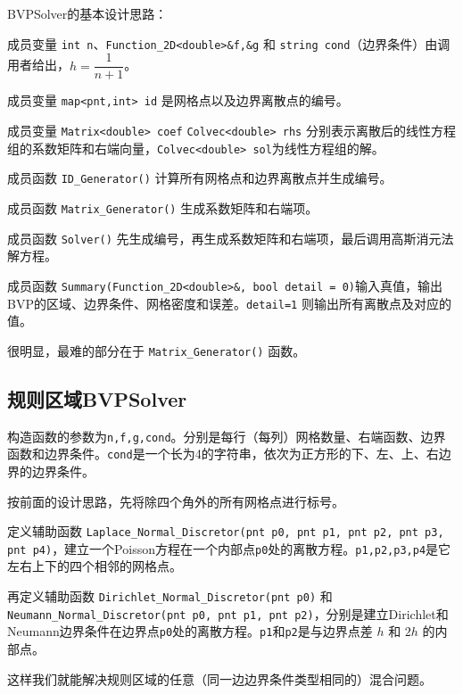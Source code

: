 \documentclass{ctexart}
\begin{document}
BVPSolver的基本设计思路：

成员变量 \verb|int n|、\verb|Function_2D<double>&f,&g| 和 \verb|string cond|（边界条件）由调用者给出，$h=\dfrac 1{n+1}$。

成员变量 \verb|map<pnt,int> id| 是网格点以及边界离散点的编号。

成员变量 \verb|Matrix<double> coef| \verb|Colvec<double> rhs| 分别表示离散后的线性方程组的系数矩阵和右端向量，\verb|Colvec<double> sol|为线性方程组的解。

成员函数 \verb|ID_Generator()| 计算所有网格点和边界离散点并生成编号。

成员函数 \verb|Matrix_Generator()| 生成系数矩阵和右端项。

成员函数 \verb|Solver()| 先生成编号，再生成系数矩阵和右端项，最后调用高斯消元法解方程。

成员函数 \verb|Summary(Function_2D<double>&, bool detail = 0)|输入真值，输出BVP的区域、边界条件、网格密度和误差。\verb|detail=1| 则输出所有离散点及对应的值。

很明显，最难的部分在于 \verb|Matrix_Generator()| 函数。

\subsection{规则区域BVPSolver}

构造函数的参数为\verb|n,f,g,cond|。分别是每行（每列）网格数量、右端函数、边界函数和边界条件。\verb|cond|是一个长为4的字符串，依次为正方形的下、左、上、右边界的边界条件。

按前面的设计思路，先将除四个角外的所有网格点进行标号。

定义辅助函数 \verb|Laplace_Normal_Discretor(pnt p0, pnt p1, pnt p2, pnt p3, pnt p4)|，建立一个Poisson方程在一个内部点\verb|p0|处的离散方程。\verb|p1,p2,p3,p4|是它左右上下的四个相邻的网格点。

再定义辅助函数 \verb|Dirichlet_Normal_Discretor(pnt p0)| 和 \verb|Neumann_Normal_Discretor(pnt p0, pnt p1, pnt p2)|，分别是建立Dirichlet和Neumann边界条件在边界点\verb|p0|处的离散方程。\verb|p1|和\verb|p2|是与边界点差 $h$ 和 $2h$ 的内部点。

这样我们就能解决规则区域的任意（同一边边界条件类型相同的）混合问题。
\end{document}
